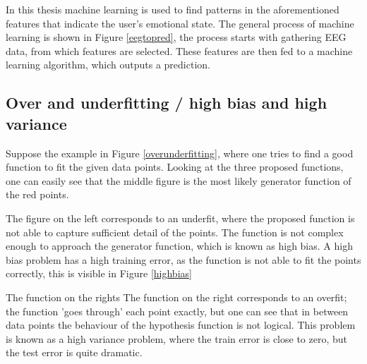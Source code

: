 \npar

In this thesis machine learning is used to find patterns in the aforementioned features that indicate the user's emotional state. The general process of machine learning is shown in Figure \ref{eegtopred}, the process starts with gathering EEG data, from which features are selected. These features are then fed to a machine learning algorithm, which outputs a prediction.



\subsection{Over and underfitting / high bias and high variance}


Suppose the example in Figure \ref{overunderfitting}, where one tries to find a good function to fit the given data points. Looking at the three proposed functions, one can easily see that the middle figure is the most likely generator function of the red points. 

The figure on the left corresponds to an underfit, where the proposed function is not able to capture sufficient detail of the points. The function is not complex enough to approach the generator function, which is known as high bias. A high bias problem has a high training error, as the function is not able to fit the points correctly, this is visible in Figure \ref{highbias}


The function on the rights The function on the right corresponds to an overfit; the function 'goes through' each point exactly, but one can see that in between data points the behaviour of the hypothesis function is not logical. This problem is known as a high variance problem, where the train error is close to zero, but the test error is quite dramatic. 


